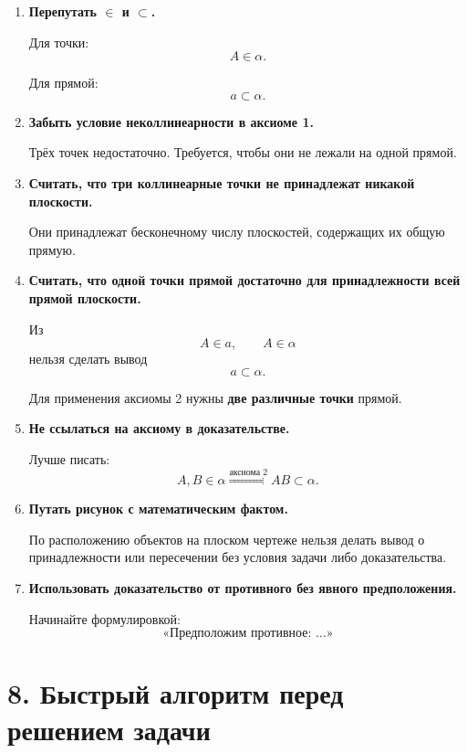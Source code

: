 \documentclass[a4paper,12pt]{article}
\newcommand{\important}[1]{\textbf{\textcolor{darkaccent}{#1}}}
\begin{document}
\begin{enumerate}
  \item \textbf{Перепутать $\in$ и $\subset$.}

  Для точки:
  \[
  A\in\alpha.
  \]

  Для прямой:
  \[
  a\subset\alpha.
  \]

  \item \textbf{Забыть условие неколлинеарности в аксиоме 1.}

  Трёх точек недостаточно. Требуется, чтобы они не лежали на одной прямой.

  \item \textbf{Считать, что три коллинеарные точки не принадлежат никакой плоскости.}

  Они принадлежат бесконечному числу плоскостей, содержащих их общую прямую.

  \item \textbf{Считать, что одной точки прямой достаточно для принадлежности всей прямой плоскости.}

  Из
  \[
  A\in a,\qquad A\in\alpha
  \]
  нельзя сделать вывод
  \[
  a\subset\alpha.
  \]

  Для применения аксиомы 2 нужны \important{две различные точки} прямой.

  \item \textbf{Не ссылаться на аксиому в доказательстве.}

  Лучше писать:
  \[
  A,B\in\alpha
  \overset{\text{аксиома 2}}{\Longrightarrow}
  AB\subset\alpha.
  \]

  \item \textbf{Путать рисунок с математическим фактом.}

  По расположению объектов на плоском чертеже нельзя делать вывод о принадлежности или пересечении без условия задачи либо доказательства.

  \item \textbf{Использовать доказательство от противного без явного предположения.}

  Начинайте формулировкой:
  \[
  \text{«Предположим противное: \ldots»}
  \]
\end{enumerate}


\section*{\textcolor{darkaccent}{8. Быстрый алгоритм перед решением задачи}}
\end{document}
